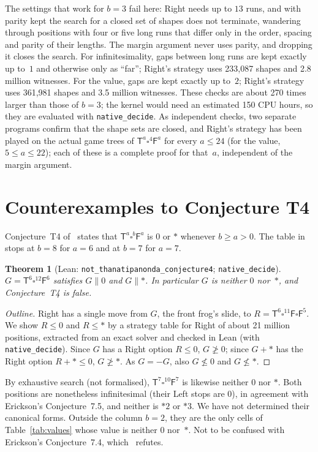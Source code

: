 \documentclass[11pt,a4paper]{article}
\newcommand{\Tt}{\mathsf{T}}
\newcommand{\Ff}{\mathsf{F}}
\newcommand{\E}{\square}
\newcommand{\lean}[1]{\texttt{#1}}
\newcommand{\fuzzy}{\mathrel{\|}}
\theoremstyle{plain}
\newtheorem{theorem}{Theorem}
\theoremstyle{remark}
\begin{document}
The settings that work for $b=3$ fail here: Right needs up to $13$ runs, and with parity kept the
search for a closed set of shapes does not terminate, wandering through positions with four or
five long runs that differ only in the order, spacing and parity of their lengths. The margin
argument never uses parity, and dropping it closes the search. For infinitesimality, gaps between
long runs are kept exactly up to~$1$ and otherwise only as ``far''; Right's strategy uses 233,087
shapes and 2.8 million witnesses. For the value, gaps are kept exactly up to~$2$; Right's strategy
uses 361,981 shapes and 3.5 million witnesses. These checks are about 270 times larger than those
of $b=3$; the kernel would need an estimated 150 CPU hours, so they are evaluated with
\lean{native\_decide}. As independent checks, two separate programs confirm that the shape sets
are closed, and Right's strategy has been played on the actual game trees of $\Tt^a\E^4\Ff^a$ for
every $a\le24$ (for the value, $5\le a\le22$); each of these is a complete proof for that~$a$,
independent of the margin argument.

\section{Counterexamples to Conjecture T4}\label{sec:T4}

Conjecture~T4 of~\cite{T11} states that $\Tt^a\E^b\Ff^a$ is $0$ or $\ast$ whenever $b\ge a>0$.
The table in~\cite{T11} stops at $b=8$ for $a=6$ and at $b=7$ for $a=7$.

\begin{theorem}[Lean: \lean{not\_thanatipanonda\_conjecture4}; \lean{native\_decide}]
$G=\Tt^6\E^{12}\Ff^6$ satisfies $G\fuzzy 0$ and $G\fuzzy\ast$. In particular $G$ is neither $0$
nor~$\ast$, and Conjecture~T4 is false.
\end{theorem}

\begin{proof}[Outline]
Right has a single move from $G$, the front frog's slide, to
$R=\Tt^6\E^{11}\Ff\E\Ff^5$. We show $R\le0$ and $R\le\ast$ by a strategy table for Right of about
21 million positions, extracted from an exact solver and checked in Lean (with
\lean{native\_decide}). Since $G$ has a Right option $R\le 0$, $G\not\ge0$; since $G+\ast$ has the
Right option $R+\ast\le0$, $G\not\ge\ast$. As $G=-G$, also $G\not\le0$ and $G\not\le\ast$.
\end{proof}

By exhaustive search (not formalised), $\Tt^7\E^{10}\Ff^7$ is likewise neither $0$ nor $\ast$.
Both positions are nonetheless infinitesimal (their Left stops are $0$), in agreement with
Erickson's Conjecture~7.5, and neither is $\ast2$ or $\ast3$. We have not determined their
canonical forms. Outside the column $b=2$, they are the only cells of Table~\ref{tab:values} whose value is
neither $0$ nor~$\ast$. Not to be confused with Erickson's
Conjecture~7.4, which~\cite{T11} refutes.
\end{document}
